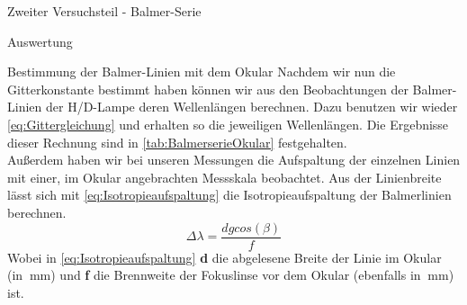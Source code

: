 \documentclass[pdftex, a4paper,11pt, twoside, ngerman]{report}
\begin{document}
\begin{chapter}{Zweiter Versuchsteil - Balmer-Serie}
\begin{section}{Auswertung}
      \begin{subsection}{Bestimmung der Balmer-Linien mit dem Okular}
        \label{chp:Balmer:sec:Auswertung:subsec:Okular}
        Nachdem wir nun die Gitterkonstante bestimmt 
        haben können wir aus den Beobachtungen der Balmer-Linien der 
        H/D-Lampe deren Wellenlängen berechnen. Dazu benutzen wir wieder 
        \cref{eq:Gittergleichung} und erhalten so die jeweiligen Wellenlängen. 
        Die Ergebnisse dieser Rechnung sind in \cref{tab:BalmerserieOkular} 
        festgehalten. \\
        Außerdem haben wir bei unseren Messungen die Aufspaltung der einzelnen 
        Linien mit einer, im Okular angebrachten Messskala beobachtet. Aus der 
        Linienbreite lässt sich mit \cref{eq:Isotropieaufspaltung} die 
        Isotropieaufspaltung der Balmerlinien berechnen.
        \begin{equation}
          \label{eq:Isotropieaufspaltung}
          \Delta\lambda=\frac{dgcos(\beta)}{f}
        \end{equation}
        Wobei in \cref{eq:Isotropieaufspaltung} \textbf{d} die abgelesene 
        Breite der Linie im Okular (in $\SI{}{\milli\meter}$) und \textbf{f} 
        die Brennweite der Fokuslinse vor dem Okular (ebenfalls in 
        $\SI{}{\milli\meter}$) ist.
        
      \end{subsection}
      
      
      

\end{section}
\end{chapter}
\end{document}
